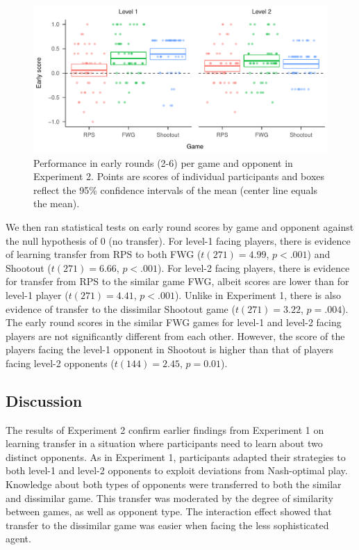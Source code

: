 \documentclass[smallextended]{svjour3}       %
\begin{document}
\begin{figure}

{\centering \includegraphics[width=\textwidth]{CBB_v2_files/figure-latex/exp2-early-score-by-opp-1} 

}

\caption{\label{ref:figure4-caption}Performance in early rounds (2-6) per game and opponent in Experiment 2. Points are scores of individual participants and boxes reflect the 95\% confidence intervals of the mean (center line equals the mean).}\label{fig:exp2-early-score-by-opp}
\end{figure}

We then ran statistical tests on early round scores by game and opponent
against the null hypothesis of 0 (no transfer). For level-1 facing
players, there is evidence of learning transfer from RPS to both FWG
(\(t(271) = 4.99\), \(p < .001\)) and Shootout (\(t(271) = 6.66\),
\(p < .001\)). For level-2 facing players, there is evidence for
transfer from RPS to the similar game FWG, albeit scores are lower than
for level-1 player (\(t(271) = 4.41\), \(p < .001\)). Unlike in
Experiment 1, there is also evidence of transfer to the dissimilar
Shootout game (\(t(271) = 3.22\), \(p = .004\)). The early round scores
in the similar FWG games for level-1 and level-2 facing players are not
significantly different from each other. However, the score of the
players facing the level-1 opponent in Shootout is higher than that of
players facing level-2 opponents (\(t(144) = 2.45\), \(p = 0.01\)).

\hypertarget{discussion-1}{%
\subsection{Discussion}\label{discussion-1}}

The results of Experiment 2 confirm earlier findings from Experiment 1
on learning transfer in a situation where participants need to learn
about two distinct opponents. As in Experiment 1, participants adapted
their strategies to both level-1 and level-2 opponents to exploit
deviations from Nash-optimal play. Knowledge about both types of
opponents were transferred to both the similar and dissimilar game. This
transfer was moderated by the degree of similarity between games, as
well as opponent type. The interaction effect showed that transfer to
the dissimilar game was easier when facing the less sophisticated agent.
\end{document}
